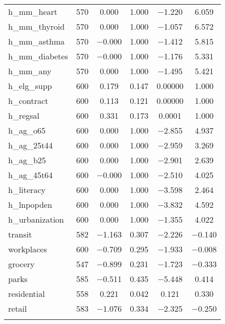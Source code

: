 \begin{table}[!htbp]
\begin{tabular}{@{\extracolsep{5pt}}lccccc}
h\_mm\_heart & 570 & 0.000 & 1.000 & $-$1.220 & 6.059 \\ 
h\_mm\_thyroid & 570 & 0.000 & 1.000 & $-$1.057 & 6.572 \\ 
h\_mm\_asthma & 570 & $-$0.000 & 1.000 & $-$1.412 & 5.815 \\ 
h\_mm\_diabetes & 570 & $-$0.000 & 1.000 & $-$1.176 & 5.331 \\ 
h\_mm\_any & 570 & 0.000 & 1.000 & $-$1.495 & 5.421 \\ 
h\_elg\_supp & 600 & 0.179 & 0.147 & 0.00000 & 1.000 \\ 
h\_contract & 600 & 0.113 & 0.121 & 0.00000 & 1.000 \\ 
h\_regsal & 600 & 0.331 & 0.173 & 0.0001 & 1.000 \\ 
h\_ag\_o65 & 600 & 0.000 & 1.000 & $-$2.855 & 4.937 \\ 
h\_ag\_25t44 & 600 & 0.000 & 1.000 & $-$2.959 & 3.269 \\ 
h\_ag\_b25 & 600 & 0.000 & 1.000 & $-$2.901 & 2.639 \\ 
h\_ag\_45t64 & 600 & $-$0.000 & 1.000 & $-$2.510 & 4.025 \\ 
h\_literacy & 600 & 0.000 & 1.000 & $-$3.598 & 2.464 \\ 
h\_lnpopden & 600 & 0.000 & 1.000 & $-$3.832 & 4.592 \\ 
h\_urbanization & 600 & 0.000 & 1.000 & $-$1.355 & 4.022 \\ 
transit & 582 & $-$1.163 & 0.307 & $-$2.226 & $-$0.140 \\ 
workplaces & 600 & $-$0.709 & 0.295 & $-$1.933 & $-$0.008 \\ 
grocery & 547 & $-$0.899 & 0.231 & $-$1.723 & $-$0.333 \\ 
parks & 585 & $-$0.511 & 0.435 & $-$5.448 & 0.414 \\ 
residential & 558 & 0.221 & 0.042 & 0.121 & 0.330 \\ 
retail & 583 & $-$1.076 & 0.334 & $-$2.325 & $-$0.250 \\ 
\hline \\[-1.8ex] 
\end{tabular} 
\end{table} 

